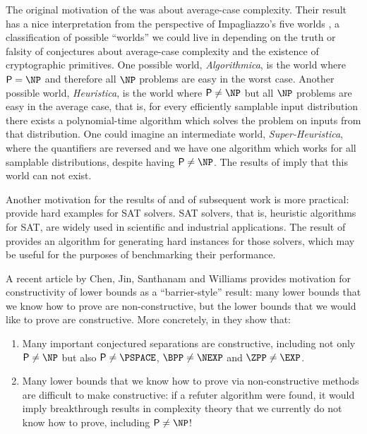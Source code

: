 The original motivation of the \cite{Gutfreund05} was about average-case complexity.
Their result has a nice interpretation from the perspective of Impagliazzo's five worlds 
\cite{Impagliazzo95}, a classification of possible ``worlds'' we could live in 
depending on the truth or falsity of conjectures about average-case complexity 
and the existence of cryptographic primitives. One possible world, \emph{Algorithmica},
is the world where $\PTIME = \NP$ and therefore all $\NP$ problems are easy in the worst case.
Another possible world, \emph{Heuristica}, is the world where $\PTIME \neq \NP$ but all
$\NP$ problems are easy in the average case, that is, for every efficiently samplable input
distribution there exists a polynomial-time algorithm which solves the problem on inputs from
that distribution.
One could imagine an intermediate world, \emph{Super-Heuristica}, where the quantifiers are reversed
and we have one algorithm which works for all samplable distributions, despite having $\PTIME \neq \NP$. 
The results of \cite{Gutfreund05} imply that this world can not exist.

Another motivation for the results of \cite{Gutfreund05} and of subsequent work \cite{Bogdanov10} 
is more practical: provide hard examples for SAT solvers. SAT solvers, that is, heuristic algorithms
for SAT, are widely used in scientific and industrial applications.
The result of \cite{Gutfreund05} provides an algorithm for generating hard instances 
for those solvers, which may be useful for the purposes of benchmarking their performance. 

A recent article by Chen, Jin, Santhanam and Williams \cite{ConstructiveSeparations} 
provides motivation for constructivity of lower bounds as a ``barrier-style'' result:
many lower bounds that we know how to prove are non-constructive, but the lower bounds
that we would like to prove are constructive. More concretely, in \cite{ConstructiveSeparations}
they show that:

\begin{enumerate}
    \item Many important conjectured separations are constructive, including not only $\PTIME \neq \NP$ but
    also $\PTIME \neq \PSPACE$, $\BPP \neq \NEXP$ and $\ZPP \neq \EXP$.
    \item Many lower bounds that we know how to prove via non-constructive methods
    are difficult to make constructive: if a refuter algorithm were found, it would
    imply breakthrough results in complexity theory that we currently do not know how 
    to prove, including $\PTIME \neq \NP$!
\end{enumerate}

